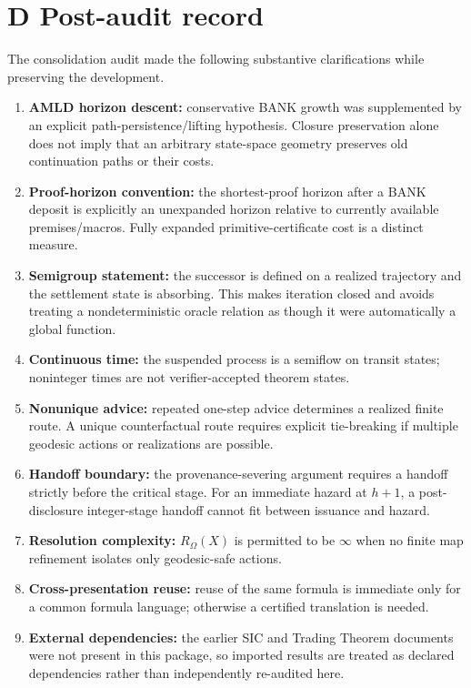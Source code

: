 \documentclass[11pt]{article}
\theoremstyle{remark}
\newcommand{\Omni}{\Omega}
\begin{document}
\section*{D Post-audit record}
The consolidation audit made the following substantive clarifications while preserving the development.
\begin{enumerate}
\item \textbf{AMLD horizon descent:} conservative BANK growth was supplemented by an explicit path-persistence/lifting hypothesis. Closure preservation alone does not imply that an arbitrary state-space geometry preserves old continuation paths or their costs.
\item \textbf{Proof-horizon convention:} the shortest-proof horizon after a BANK deposit is explicitly an unexpanded horizon relative to currently available premises/macros. Fully expanded primitive-certificate cost is a distinct measure.
\item \textbf{Semigroup statement:} the successor is defined on a realized trajectory and the settlement state is absorbing. This makes iteration closed and avoids treating a nondeterministic oracle relation as though it were automatically a global function.
\item \textbf{Continuous time:} the suspended process is a semiflow on transit states; noninteger times are not verifier-accepted theorem states.
\item \textbf{Nonunique advice:} repeated one-step advice determines a realized finite route. A unique counterfactual route requires explicit tie-breaking if multiple geodesic actions or realizations are possible.
\item \textbf{Handoff boundary:} the provenance-severing argument requires a handoff strictly before the critical stage. For an immediate hazard at $h+1$, a post-disclosure integer-stage handoff cannot fit between issuance and hazard.
\item \textbf{Resolution complexity:} $R_{\Omni}(X)$ is permitted to be $\infty$ when no finite map refinement isolates only geodesic-safe actions.
\item \textbf{Cross-presentation reuse:} reuse of the same formula is immediate only for a common formula language; otherwise a certified translation is needed.
\item \textbf{External dependencies:} the earlier SIC and Trading Theorem documents were not present in this package, so imported results are treated as declared dependencies rather than independently re-audited here.
\end{enumerate}
\end{document}
